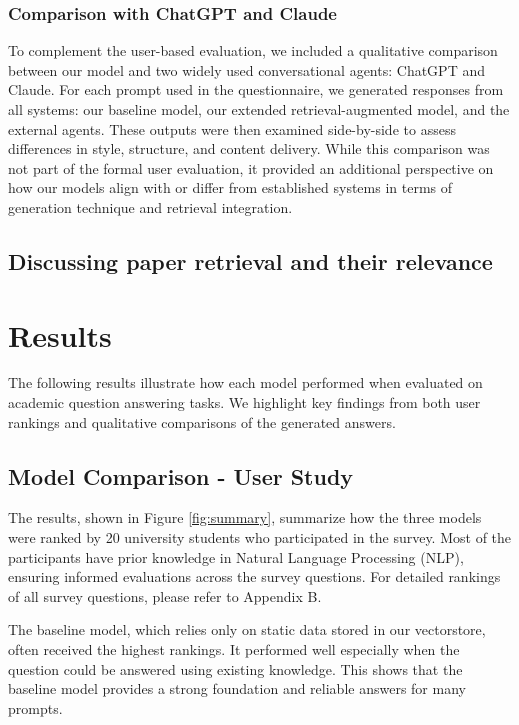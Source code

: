 \documentclass[fleqn,moreauthors,10pt]{ds_report}
\begin{document}
\subsubsection*{Comparison with ChatGPT and Claude}

To complement the user-based evaluation, we included a qualitative comparison between our model and two widely used conversational agents: ChatGPT and Claude. For each prompt used in the questionnaire, we generated responses from all systems: our baseline model, our extended retrieval-augmented model, and the external agents. These outputs were then examined side-by-side to assess differences in style, structure, and content delivery. While this comparison was not part of the formal user evaluation, it provided an additional perspective on how our models align with or differ from established systems in terms of generation technique and retrieval integration.



\subsection*{Discussing paper retrieval and their relevance}


\section*{Results}

The following results illustrate how each model performed when evaluated on academic question answering tasks. We highlight key findings from both user rankings and qualitative comparisons of the generated answers.

\subsection*{Model Comparison - User Study}

The results, shown in Figure \ref{fig:summary}, summarize how the three models were ranked by 20 university students who participated in the survey. Most of the participants have prior knowledge in Natural Language Processing (NLP), ensuring informed evaluations across the survey questions. For detailed rankings of all survey questions, please refer to Appendix B.


The baseline model, which relies only on static data stored in our vectorstore, often received the highest rankings. It performed well especially when the question could be answered using existing knowledge. This shows that the baseline model provides a strong foundation and reliable answers for many prompts.
\end{document}
